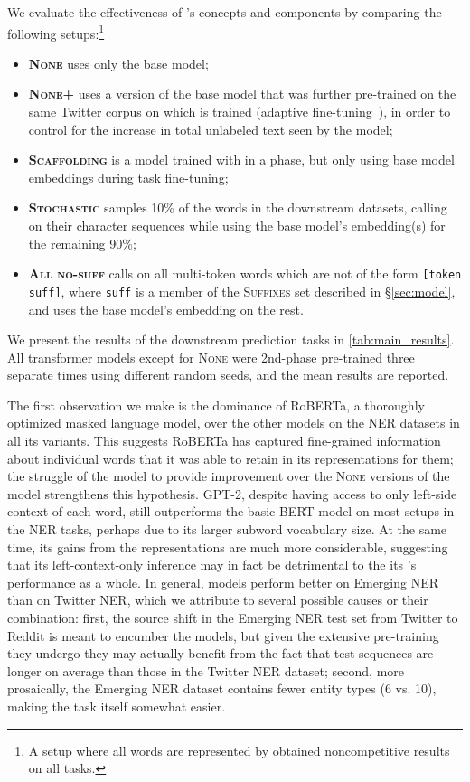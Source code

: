 We evaluate the effectiveness of \tokdetok{}'s concepts and components by comparing the following setups:\footnote{A setup where all words are represented by \tok{} obtained noncompetitive results on all tasks.}
\begin{itemize}
    \item \textsc{\textbf{None}} uses only the base model;
    \item \textsc{\textbf{None+\ppt{}}} uses a version of the base model that was further pre-trained on the same Twitter corpus on which \tokdetok{} is trained (adaptive fine-tuning~\cite{ruder2021lmfinetuning}), in order to control for the increase in total unlabeled text seen by the model;
    \item \textsc{\textbf{Scaffolding}} is a model trained with \tokdetok{} in a \ppt{} phase, but only using base model embeddings during task fine-tuning;
    \item \textsc{\textbf{Stochastic}} samples 10\% of the words in the downstream datasets, calling \tok{} on their character sequences while using the base model's embedding(s) for the remaining 90\%;
    \item \textsc{\textbf{All no-suff}} calls \tok{} on all multi-token words which are not of the form \texttt{[token suff]}, where \texttt{suff} is a member of the \textsc{Suffixes} set described in \S\ref{sec:model}, and uses the base model's embedding on the rest.
\end{itemize}




We present the results of the downstream prediction tasks in \autoref{tab:main_results}.
All transformer models except for \textsc{None} were 2nd-phase pre-trained three separate times using different random seeds, and the mean results are reported.

The first observation we make is the dominance of RoBERTa, a thoroughly optimized masked language model, over the other models on the NER datasets in all its variants.
This suggests RoBERTa has captured fine-grained information about individual words that it was able to retain in its representations for them; the struggle of the \tokdetok{} model to provide improvement over the \textsc{None} versions of the model strengthens this hypothesis.
GPT-2, despite having access to only left-side context of each word, still outperforms the basic BERT model on most setups in the NER tasks, perhaps due to its larger subword vocabulary size.
At the same time, its gains from the \tok{} representations are much more considerable, suggesting that its left-context-only inference may in fact be detrimental to the its \mmod{}'s performance as a whole.
In general, models perform better on Emerging NER than on Twitter NER, which we attribute to several possible causes or their combination: first, the source shift in the Emerging NER test set from Twitter to Reddit is meant to encumber the models, but given the extensive pre-training they undergo they may actually benefit from the fact that test sequences are longer on average than those in the Twitter NER dataset;
second, more prosaically, the Emerging NER dataset contains fewer entity types (6 vs. 10), making the task itself somewhat easier.

